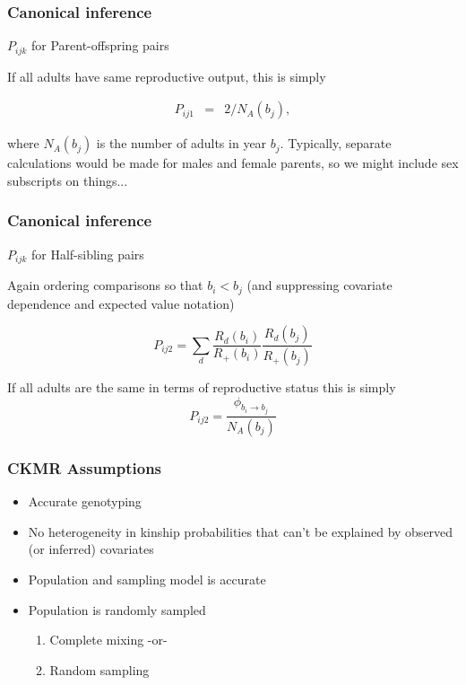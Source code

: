 \documentclass[serif,mathserif]{beamer}
\begin{document}
\begin{frame}
  \frametitle{Canonical inference}
  \textcolor{noaaturq}{$P_{ijk}$ for Parent-offspring pairs}

  \vspace{0.5cm}

  If all adults have same reproductive output, this is simply

  \begin{eqnarray*}
   P_{ij1} &  = & 2/N_A(b_j),
  \end{eqnarray*}

  \vspace{.5cm}

  where $N_A(b_j)$ is the number of adults in year $b_j$.
  Typically, separate calculations would be made for males and female parents,
  so we might include sex subscripts on things...

\end{frame}

\begin{frame}
  \frametitle{Canonical inference}
  \textcolor{noaaturq}{$P_{ijk}$ for Half-sibling pairs}

  \vspace{0.5cm}
  Again ordering comparisons so that $b_i < b_j$ (and suppressing covariate dependence and expected value notation)

  \begin{equation*}
  P_{ij2} = \sum_{d}  \frac{R_d(b_i)}{R_+(b_i)} \frac{R_d(b_j)}{R_+(b_j)}
  \label{eq:halfsib}
  \end{equation*}

  If all adults are the same in terms of reproductive status this is simply
   \begin{equation*}
  P_{ij2} = \frac{\phi_{b_i \rightarrow b_j}}{N_A(b_j)}
  \label{eq:halfsib}
  \end{equation*}
\end{frame}


\begin{frame}
\frametitle{CKMR Assumptions}
\begin{itemize}
  \item Accurate genotyping
  \item No heterogeneity in kinship probabilities that can't be explained by observed (or inferred)
        covariates \pause
  \item Population and sampling model is accurate \pause
  \item Population is randomly sampled
       \begin{enumerate}
         \item Complete mixing -or-
         \item Random sampling
       \end{enumerate}
\end{itemize}
\end{frame}
\end{document}
